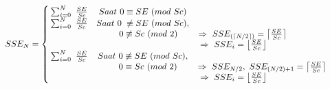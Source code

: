 \begin{equation}\label{eq:sub_enemy_levels2}
\resizebox{\columnwidth}{!}{%
	$SSE_{N} = \left\{\begin{matrix}
	\hspace{0.2em} \sum_{i = 0}^{N}\ \frac{SE}{Sc} & Saat\ 0 \equiv SE\ (mod\ Sc) & \\
	
	\hspace{0.2em} \sum_{i = 0}^{N}\ \frac{SE}{Sc} & Saat\ 0 \hspace{0.3em} \not\equiv SE\ (mod\ Sc), & \\
	&\hspace{1.3em}  0 \not\equiv Sc\ (mod\ 2) & \hspace{-4.5em} \Rightarrow\ SSE_{(\left \lceil N/2 \right \rceil)}  = \left \lceil \frac{SE}{Sc} \right \rceil &\\
	
	& & \hspace{-6.6em} \Rightarrow\ SSE_{i}  = \left \lfloor \frac{SE}{Sc} \right \rfloor &\\
	
	\hspace{0.2em} \sum_{i = 0}^{N}\ \frac{SE}{Sc} & Saat\ 0 \not\equiv SE\ (mod\ Sc), & \\
	&\hspace{1.2em}  0 \equiv Sc\ (mod\ 2) & \Rightarrow\ SSE_{N/2},\ SSE_{(N/2) + 1}  = \left \lceil \frac{SE}{Sc} \right \rceil &\\
	
	& & \hspace{-6.6em} \Rightarrow\ SSE_{i}  = \left \lfloor \frac{SE}{Sc} \right \rfloor &\\
	\end{matrix}\right.$%
}
\end{equation}
\vspace{1ex}

